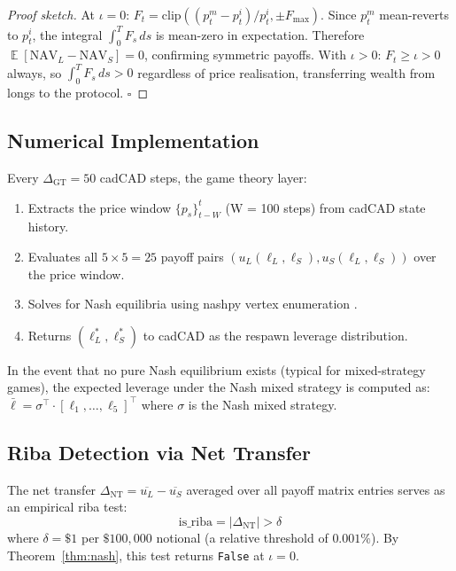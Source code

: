 \documentclass[10pt,twocolumn]{article}
\theoremstyle{plain}
\theoremstyle{definition}
\DeclareMathOperator{\E}{\mathbb{E}}
\begin{document}
\begin{proof}[Proof sketch]
At $\iota=0$: $F_t = \mathrm{clip}((p^m_t - p^i_t)/p^i_t, \pm F_{\max})$.
Since $p^m_t$ mean-reverts to $p^i_t$, the integral
$\int_0^T F_s\,ds$ is mean-zero in expectation.
Therefore $\E[\mathrm{NAV}_L - \mathrm{NAV}_S] = 0$,
confirming symmetric payoffs.  With $\iota > 0$:
$F_t \geq \iota > 0$ always, so $\int_0^T F_s\,ds > 0$
regardless of price realisation, transferring wealth from
longs to the protocol.  \qquad $\square$
\end{proof}

\subsection{Numerical Implementation}

Every $\Delta_{\mathrm{GT}} = 50$ cadCAD steps, the game theory
layer:

\begin{enumerate}[leftmargin=*,noitemsep]
\item Extracts the price window $\{p_s\}_{t-W}^t$
  (W = 100 steps) from cadCAD state history.
\item Evaluates all $5\times5 = 25$ payoff pairs
  $(u_L(\ell_L, \ell_S), u_S(\ell_L, \ell_S))$
  over the price window.
\item Solves for Nash equilibria using nashpy vertex
  enumeration \cite{Knight2016}.
\item Returns $(\ell^*_L, \ell^*_S)$ to cadCAD as
  the respawn leverage distribution.
\end{enumerate}

In the event that no pure Nash equilibrium exists
(typical for mixed-strategy games), the expected leverage
under the Nash mixed strategy is computed as:
$\bar\ell = \sigma^\top \cdot [\ell_1,\ldots,\ell_5]^\top$
where $\sigma$ is the Nash mixed strategy.

\subsection{Riba Detection via Net Transfer}

The net transfer
$\Delta_{\mathrm{NT}} = \overline{u_L} - \overline{u_S}$
averaged over all payoff matrix entries serves as an
empirical riba test:
\begin{equation}
  \text{is\_riba} = |\Delta_{\mathrm{NT}}| > \delta
  \label{eq:riba_test}
\end{equation}
where $\delta = \$1$ per $\$100{,}000$ notional (a
relative threshold of $0.001\%$).  By Theorem~\ref{thm:nash},
this test returns \texttt{False} at $\iota=0$.
\end{document}
